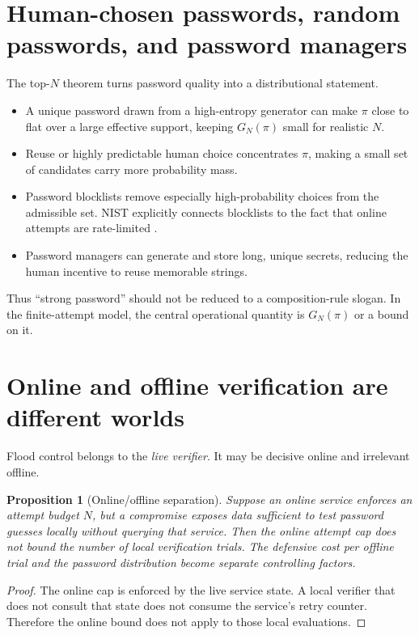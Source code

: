 \documentclass[11pt,openany]{book}
\newtheorem{proposition}[theorem]{Proposition}
\theoremstyle{definition}
\theoremstyle{remark}
\begin{document}
\section{Human-chosen passwords, random passwords, and password managers}
The top-$N$ theorem turns password quality into a distributional statement.
\begin{itemize}
\item A unique password drawn from a high-entropy generator can make $\pi$ close to flat over a large effective support, keeping $G_N(\pi)$ small for realistic $N$.
\item Reuse or highly predictable human choice concentrates $\pi$, making a small set of candidates carry more probability mass.
\item Password blocklists remove especially high-probability choices from the admissible set. NIST explicitly connects blocklists to the fact that online attempts are rate-limited \cite{NIST80063B4}.
\item Password managers can generate and store long, unique secrets, reducing the human incentive to reuse memorable strings.
\end{itemize}
Thus ``strong password'' should not be reduced to a composition-rule slogan. In the finite-attempt model, the central operational quantity is $G_N(\pi)$ or a bound on it.

\section{Online and offline verification are different worlds}
Flood control belongs to the \emph{live verifier}. It may be decisive online and irrelevant offline.

\begin{proposition}[Online/offline separation]\label{prop:onlineoffline}
Suppose an online service enforces an attempt budget $N$, but a compromise exposes data sufficient to test password guesses locally without querying that service. Then the online attempt cap does not bound the number of local verification trials. The defensive cost per offline trial and the password distribution become separate controlling factors.
\end{proposition}
\begin{proof}
The online cap is enforced by the live service state. A local verifier that does not consult that state does not consume the service's retry counter. Therefore the online bound does not apply to those local evaluations.
\end{proof}
\end{document}

